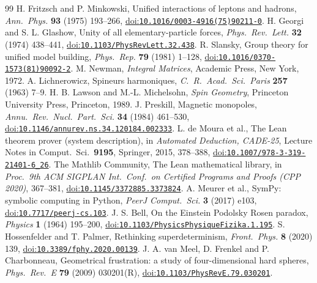 \documentclass[a4paper,11pt]{article}
\numberwithin{equation}{section}
\theoremstyle{jsplain}
\theoremstyle{jsrem}
\begin{document}
\begin{thebibliography}{99}
 H. Fritzsch and P. Minkowski, Unified interactions of leptons and hadrons, \textit{Ann.\ Phys.} \textbf{93} (1975) 193--266, \href{https://doi.org/10.1016/0003-4916(75)90211-0}{doi:\nolinkurl{10.1016/0003-4916(75)90211-0}}.
 H. Georgi and S. L. Glashow, Unity of all elementary-particle forces, \textit{Phys.\ Rev.\ Lett.} \textbf{32} (1974) 438--441, \href{https://doi.org/10.1103/PhysRevLett.32.438}{doi:\nolinkurl{10.1103/PhysRevLett.32.438}}.
 R. Slansky, Group theory for unified model building, \textit{Phys.\ Rep.} \textbf{79} (1981) 1--128, \href{https://doi.org/10.1016/0370-1573(81)90092-2}{doi:\nolinkurl{10.1016/0370-1573(81)90092-2}}.
 M. Newman, \textit{Integral Matrices}, Academic Press, New York, 1972.
 A. Lichnerowicz, Spineurs harmoniques, \textit{C.\ R.\ Acad.\ Sci.\ Paris} \textbf{257} (1963) 7--9.
 H. B. Lawson and M.-L. Michelsohn, \textit{Spin Geometry}, Princeton University Press, Princeton, 1989.
 J. Preskill, Magnetic monopoles, \textit{Annu.\ Rev.\ Nucl.\ Part.\ Sci.} \textbf{34} (1984) 461--530, \href{https://doi.org/10.1146/annurev.ns.34.120184.002333}{doi:\nolinkurl{10.1146/annurev.ns.34.120184.002333}}.
 L. de Moura et al., The Lean theorem prover (system description), in \textit{Automated Deduction, CADE-25}, Lecture Notes in Comput.\ Sci.\ \textbf{9195}, Springer, 2015, 378--388, \href{https://doi.org/10.1007/978-3-319-21401-6_26}{doi:\nolinkurl{10.1007/978-3-319-21401-6_26}}.
 The Mathlib Community, The Lean mathematical library, in \textit{Proc.\ 9th ACM SIGPLAN Int.\ Conf.\ on Certified Programs and Proofs (CPP 2020)}, 367--381, \href{https://doi.org/10.1145/3372885.3373824}{doi:\nolinkurl{10.1145/3372885.3373824}}.
 A. Meurer et al., SymPy: symbolic computing in Python, \textit{PeerJ Comput.\ Sci.} \textbf{3} (2017) e103, \href{https://doi.org/10.7717/peerj-cs.103}{doi:\nolinkurl{10.7717/peerj-cs.103}}.
 J. S. Bell, On the Einstein Podolsky Rosen paradox, \textit{Physics} \textbf{1} (1964) 195--200, \href{https://doi.org/10.1103/PhysicsPhysiqueFizika.1.195}{doi:\nolinkurl{10.1103/PhysicsPhysiqueFizika.1.195}}.
 S. Hossenfelder and T. Palmer, Rethinking superdeterminism, \textit{Front.\ Phys.} \textbf{8} (2020) 139, \href{https://doi.org/10.3389/fphy.2020.00139}{doi:\nolinkurl{10.3389/fphy.2020.00139}}.
 J. A. van Meel, D. Frenkel and P. Charbonneau, Geometrical frustration: a study of four-dimensional hard spheres, \textit{Phys.\ Rev.\ E} \textbf{79} (2009) 030201(R), \href{https://doi.org/10.1103/PhysRevE.79.030201}{doi:\nolinkurl{10.1103/PhysRevE.79.030201}}.

\end{thebibliography}
\end{document}
